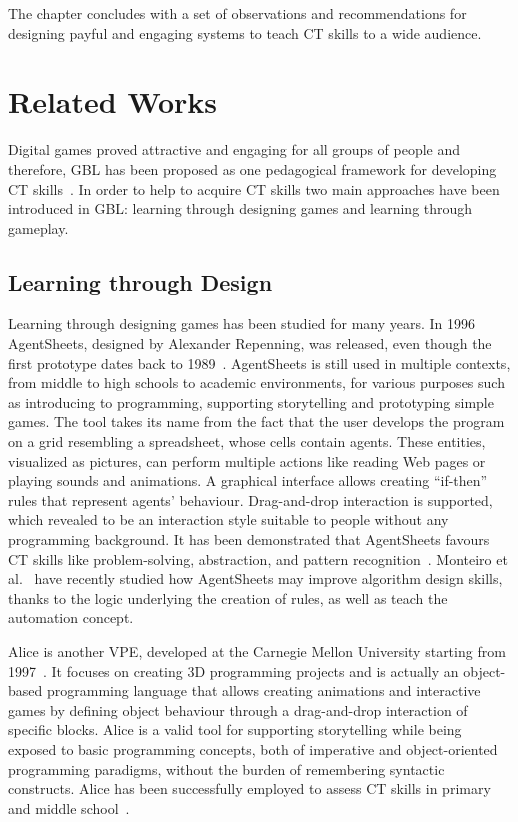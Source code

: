 The chapter concludes with a set of observations and recommendations for designing payful and engaging systems to teach \ac{CT} skills to a wide audience.

\section{Related Works}
Digital games proved attractive and engaging for all groups of people and therefore, \ac{GBL} has been proposed as one pedagogical framework for developing \ac{CT} skills~\cite{Weintrop:2016vc}. In order to help to acquire \ac{CT} skills two main approaches have been introduced in \ac{GBL}: learning through designing games and learning through gameplay.

\subsection{Learning through Design}
Learning through designing games has been studied for many years. In 1996 AgentSheets, designed by Alexander Repenning, was released, even though the first prototype dates back to 1989~\cite{Repenning:2000}. AgentSheets is still used in multiple contexts, from middle to high schools to academic environments, for various purposes such as introducing to programming, supporting storytelling and prototyping simple games. The tool takes its name from the fact that the user develops the program on a grid resembling a spreadsheet, whose cells contain agents. These entities, visualized as pictures, can perform multiple actions like reading Web pages or playing sounds and animations. A graphical interface allows creating ``if-then'' rules that represent agents' behaviour. Drag-and-drop interaction is supported, which revealed to be an interaction style suitable to people without any programming background. It has been demonstrated that AgentSheets favours \ac{CT} skills like problem-solving, abstraction, and pattern recognition~\cite{Koh:2010}. Monteiro et al.~\cite{Monteiro:2017} have recently studied how AgentSheets may improve algorithm design skills, thanks to the logic underlying the creation of rules, as well as teach the automation concept. 

Alice is another \ac{VPE}, developed at the Carnegie Mellon University starting from 1997~\cite{Herbert:2012}. It focuses on creating 3D programming projects and is actually an object-based programming language that allows creating animations and interactive games by defining object behaviour through a drag-and-drop interaction of specific blocks. Alice is a valid tool for supporting storytelling while being exposed to basic programming concepts, both of imperative and object-oriented programming paradigms, without the burden of remembering syntactic constructs. 
Alice has been successfully employed to assess \ac{CT} skills in primary and middle school~\cite{Wang:2014jy,Werner:2012}.

